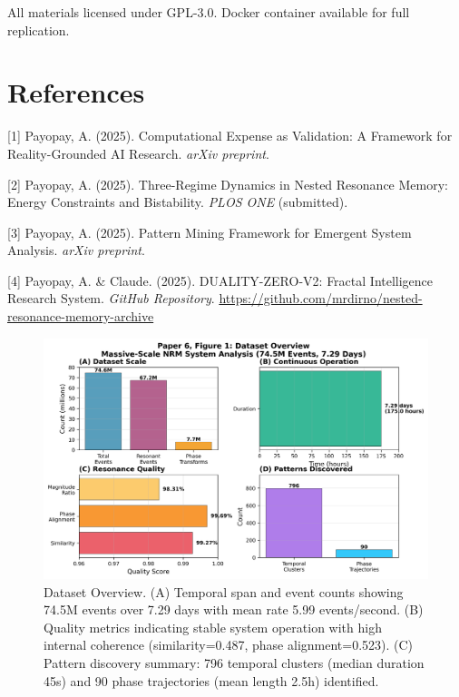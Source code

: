 \documentclass[11pt]{article}
\begin{document}
All materials licensed under GPL-3.0. Docker container available for full replication.

\section*{References}

[1] Payopay, A. (2025). Computational Expense as Validation: A Framework for Reality-Grounded AI Research. \emph{arXiv preprint}.

[2] Payopay, A. (2025). Three-Regime Dynamics in Nested Resonance Memory: Energy Constraints and Bistability. \emph{PLOS ONE} (submitted).

[3] Payopay, A. (2025). Pattern Mining Framework for Emergent System Analysis. \emph{arXiv preprint}.

[4] Payopay, A. \& Claude. (2025). DUALITY-ZERO-V2: Fractal Intelligence Research System. \emph{GitHub Repository}. \url{https://github.com/mrdirno/nested-resonance-memory-archive}

\begin{figure}[t]
\centering
\includegraphics[width=0.95\linewidth]{figure1_dataset_overview.png}
\caption{Dataset Overview. (A) Temporal span and event counts showing 74.5M events over 7.29 days with mean rate 5.99 events/second. (B) Quality metrics indicating stable system operation with high internal coherence (similarity=0.487, phase alignment=0.523). (C) Pattern discovery summary: 796 temporal clusters (median duration 45s) and 90 phase trajectories (mean length 2.5h) identified.}
\end{figure}
\end{document}
